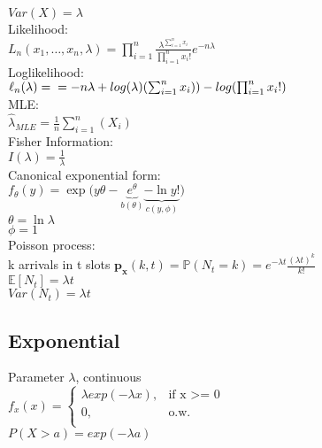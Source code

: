 $Var(X)=\lambda$\\

Likelihood:\\
$L_ n(x_1, \ldots , x_ n, \lambda) = \prod _{i = 1}^ n \frac{\lambda^{\sum_{i=1}^{n} x_i}}{\prod _{i = 1}^ n x_i!} e^{-n\lambda}$\\

Loglikelihood:\\
$\ell_n (\lambda)= \\
= -n\lambda + log(\lambda)(\sum_{i=1}^n x_i)) - log(\prod _{i = 1}^ n x_i!)$\\

MLE:\\

$\hat{\lambda}_{MLE} = \frac{1}{n} \sum^n_{i=1}(X_i)$\\

Fisher Information:\\

$I(\lambda)= \frac{1}{\lambda}$\\

Canonical exponential form:\\

$ f_{\theta}(y) = \exp\big(y\theta - \underbrace{e^\theta}_{b(\theta)} \underbrace{- \ln y!}_{c(y, \phi)}\big)$\\
$\theta = \ln \lambda$\\
$\phi = 1$\\

Poisson process:\\
k arrivals in t slots
$\mathbf{p_x}(k,t) = \mathbb{P}(N_t=k)=e^{-\lambda t} \frac{(\lambda t)^k}{k!}$\\

$\mathbb{E}[N_t]=\lambda t$\\

$Var(N_t)=\lambda t$

\subsection*{Exponential}
Parameter $\lambda$, continuous\\
$ f_x(x)=
	\begin{cases}
		 \lambda exp(-\lambda x),&\text{if x >= 0}\\
		0,&\text{o.w.}\\
	\end{cases}
$\\

$P(X>a)= exp(-\lambda a)$\\

